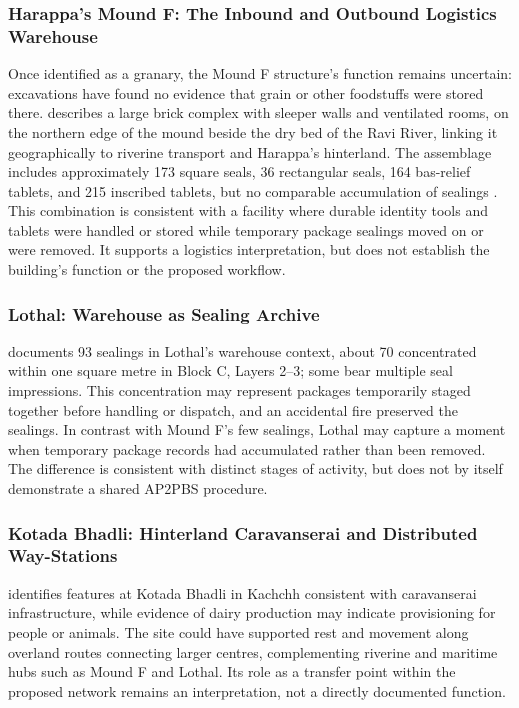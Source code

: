 \documentclass[12pt]{article}
\begin{document}
\subsubsection{Harappa's Mound F: The Inbound and Outbound Logistics Warehouse}

Once identified as a granary, the Mound F structure's function remains uncertain:
excavations have found no evidence that grain or other foodstuffs were stored
there. \citet{marshall1931} describes a large brick complex with sleeper walls
and ventilated rooms, on the northern edge of the mound beside the dry bed of the
Ravi River, linking it geographically to riverine transport and Harappa's
hinterland. The assemblage includes approximately 173 square seals, 36 rectangular
seals, 164 bas-relief tablets, and 215 inscribed tablets, but no comparable
accumulation of sealings \citep{fuls2023catalog}. This combination is consistent
with a facility where durable identity tools and tablets were handled or stored
while temporary package sealings moved on or were removed. It supports a logistics
interpretation, but does not establish the building's function or the proposed
workflow.

\subsubsection{Lothal: Warehouse as Sealing Archive}

\citet{frenez2024} documents 93 sealings in Lothal's warehouse context, about
70 concentrated within one square metre in Block C, Layers 2--3; some bear
multiple seal impressions. This concentration may represent packages temporarily
staged together before handling or dispatch, and an accidental fire preserved
the sealings. In contrast with Mound F's few sealings, Lothal may capture a
moment when temporary package records had accumulated rather than been removed.
The difference is consistent with distinct stages of activity, but does not by
itself demonstrate a shared AP2PBS procedure.

\subsubsection{Kotada Bhadli: Hinterland Caravanserai and Distributed Way-Stations}

\citet{shirvalkar2025caravanserai} identifies features at Kotada Bhadli in
Kachchh consistent with caravanserai infrastructure, while evidence of dairy
production may indicate provisioning for people or animals. The site could have
supported rest and movement along overland routes connecting larger centres,
complementing riverine and maritime hubs such as Mound F and Lothal. Its role as
a transfer point within the proposed network remains an interpretation, not a
directly documented function.
\end{document}
